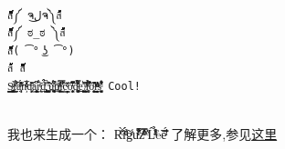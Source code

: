 \documentclass[12pt]{article}
\begin{document}
\makeblogtitle

\begin{verbatim}

ส็็็็็็็็็็็็็็็็็็็็็็็็็༼ ຈل͜ຈ༽ส้้้้้้้้้้้้้้้้้้้้้้้
ส็็็็็็็็็็็็็็็็็็็็็็็็็༼ ಠ_ಠ ༽ส้้้้้้้้้้้้้้้้้้้้้้้
ส็็็็็็็็็็็็็็็็็็็( ͡° ͜ʖ ͡°)
ส้้้้้้้้้้้้้้้้้้้้้้้ ส็็็็็็็็็็็็็็็็็็็็็็็็็ 
S̢͎̳̞̲͈̪̳̻ͮͩt̟̳̏ͬ̔͒̈́ͦ͠a̞̤̝̟ͫ̽̂̈́ͪ͐͘n͕͐͑ͪ͐ͦ͋ͮ̅d͚̗̙̎ͫ̌â̗̬͓͍͍̳̥͆̕͠r̢̘ͣ̀d̢̢̢̘̲̺͙̂̈́̊ͬ ͎͎̫͚̣̺̤̖͊̏̀ͬ͞u̧͆ͩ́͒҉͔̠̪̖̹̠̰͎ṇ̸̛͚̟̫͎̟̣̜͋̈́ͧͯi̲̲̺͑̐ͣ͗̿̕͘͝c̦͈͇̦͈ͦ̆ͨ͝o̟̭̫̥͎̹͆́ͥ͊ͬ̏͝d̪͔̯̥̩͙̝ͩ̏͒̈́ͩ̿́̕͜ͅe͍͓̻̊͛ͅ ̸̧̻̺̤̠͙ͪ̋̽l̛̥̥ͬ͂̈́ͤ̓̀̓̚͘ͅͅͅǒ̮͓̼ͭ̂̆̇̕͘ͅl̯̯̟̗͔̳͉̰ͫ̒ͧͦͩͦ̓̓͢ͅs̝͎͚̗̮̟̒̔͛̈̊͋͒ͩͅ Cool!


\end{verbatim}

我也来生成一个： Rͨ̍̀̐iͩͤͦ̈́́̓g̃ͬ̾u̓͆ͬ̐̎ͨ͋̆z̑ͤͯ̒ͦ͗̿̍ ͤ̇̒L͒̂͑̎ͣͣͯ̉e̊e̐̏̏̆̑͗ͥ́ 了解更多,参见\href{https://news.ycombinator.com/item?id=3665086}{这里}
\end{document}
